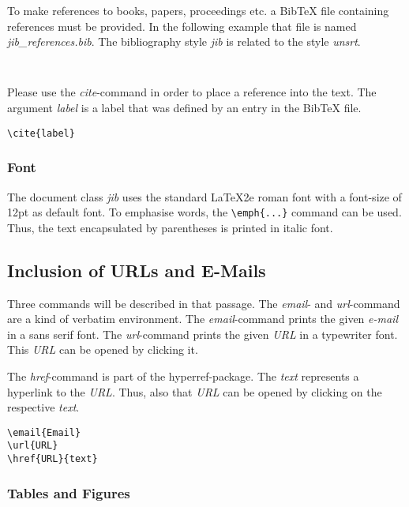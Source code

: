 \documentclass{jib}
\begin{document}
To make references to books\cite{jibBook}, papers\cite{jibArticle},
proceedings\cite{jibProceedings} etc. a BibTeX file containing references must
be provided. In the following example that file is named
\emph{jib\_references.bib}. The bibliography style \emph{jib} is related to the
style \emph{unsrt}.

\begin{lstlisting}[emph={marke1,marke2,label1,label2,description1,description2,format}]


\end{lstlisting}

Please use the \emph{cite}-command in order to place a reference into the text.
The argument \emph{label} is a label that was defined by an entry in the BibTeX
file.

\begin{lstlisting}
\cite{label}
\end{lstlisting}

\subsubsection{Font}

The document class \emph{jib} uses the standard \LaTeX2e roman font with a
font-size of 12pt as default font. To emphasise words, the
\lstinline|\emph{...}| command can be used. Thus, the text encapsulated by
parentheses is printed in italic font.

\subsection{Inclusion of URLs and E-Mails}

Three commands will be described in that passage. The \emph{email}- and
\emph{url}-command are a kind of verbatim environment. The \emph{email}-command
prints the given \emph{e-mail} in a sans serif font. The \emph{url}-command
prints the given \emph{URL} in a typewriter font. This \emph{URL} can be opened
by clicking it.

The \emph{href}-command is part of the hyperref-package. The \emph{text}
represents a hyperlink to the \emph{URL}. Thus, also that \emph{URL} can be
opened by clicking on the respective \emph{text}.

\begin{lstlisting}[emph={Email,URL,text}]
\email{Email}
\url{URL}
\href{URL}{text}
\end{lstlisting}

\subsubsection{Tables and Figures}
\end{document}
